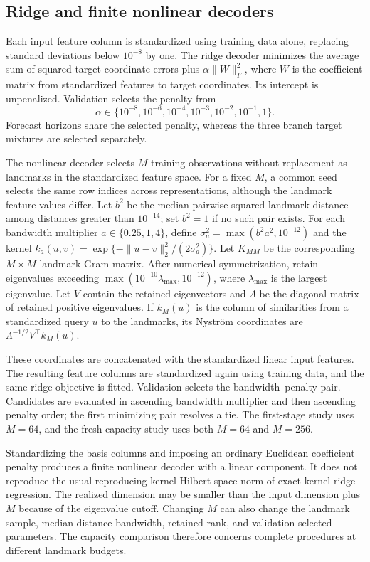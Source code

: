 \subsection{Ridge and finite nonlinear decoders}

Each input feature column is standardized using training data alone,
replacing standard deviations below $10^{-8}$ by one. The ridge decoder
minimizes the average sum of squared target-coordinate errors plus
$\alpha\|W\|_F^2$, where $W$ is the coefficient matrix from standardized
features to target coordinates. Its intercept is unpenalized. Validation
selects the penalty from
\[
 \alpha\in\{10^{-8},10^{-6},10^{-4},10^{-3},10^{-2},10^{-1},1\}.
\]
Forecast horizons share the selected penalty, whereas the three branch
target mixtures are selected separately.

The nonlinear decoder selects $M$ training observations without
replacement as landmarks in the standardized feature space. For a fixed
$M$, a common seed selects the same row indices across representations,
although the landmark feature values differ. Let $b^2$ be the median
pairwise squared landmark distance among distances greater than
$10^{-14}$; set $b^2=1$ if no such pair exists. For each bandwidth
multiplier $a\in\{0.25,1,4\}$, define
$\sigma_a^2=\max(b^2a^2,10^{-12})$ and the kernel
$k_a(u,v)=\exp\{-\|u-v\|_2^2/(2\sigma_a^2)\}$.
Let $K_{MM}$ be the corresponding $M\times M$ landmark Gram matrix.
After numerical symmetrization, retain eigenvalues exceeding
$\max(10^{-10}\lambda_{\max},10^{-12})$, where $\lambda_{\max}$ is
the largest eigenvalue. Let $V$ contain the retained eigenvectors and
$\Lambda$ be the diagonal matrix of retained positive eigenvalues.
If $k_M(u)$ is the column of similarities from a standardized query
$u$ to the landmarks, its Nystr\"om coordinates are
$\Lambda^{-1/2}V^\top k_M(u)$.

These coordinates are concatenated with the standardized linear input
features. The resulting feature columns are standardized again using
training data, and the same ridge objective is fitted. Validation
selects the bandwidth--penalty pair. Candidates are evaluated in
ascending bandwidth multiplier and then ascending penalty order; the
first minimizing pair resolves a tie. The first-stage study uses
$M=64$, and the fresh capacity study uses both $M=64$ and $M=256$.

Standardizing the basis columns and imposing an ordinary Euclidean
coefficient penalty produces a finite nonlinear decoder with a linear
component. It does not reproduce the usual reproducing-kernel Hilbert
space norm of exact kernel ridge regression. The realized dimension may
be smaller than the input dimension plus $M$ because of the eigenvalue
cutoff. Changing $M$ can also change the landmark sample, median-distance
bandwidth, retained rank, and validation-selected parameters. The
capacity comparison therefore concerns complete procedures at different
landmark budgets.

